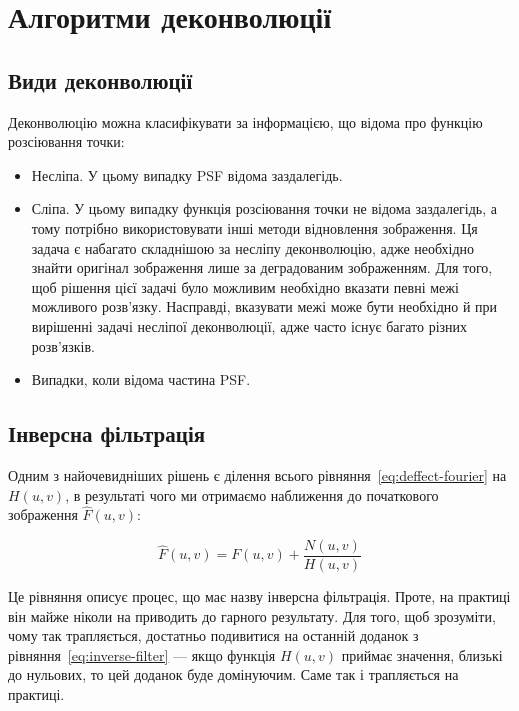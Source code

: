 \documentclass{diploma}
\begin{document}
  \section{Алгоритми деконволюції}
    \subsection{Види деконволюції}
      Деконволюцію можна класифікувати за інформацією, що відома про функцію
      розсіювання точки:
      \begin{itemize}
        \item Несліпа.
          У цьому випадку PSF відома заздалегідь.
        \item Сліпа.
          У цьому випадку функція розсіювання точки не відома заздалегідь, а
          тому потрібно використовувати інші методи відновлення зображення.
          Ця задача є набагато складнішою за несліпу деконволюцію, адже
          необхідно знайти оригінал зображення лише за деградованим зображенням.
          Для того, щоб рішення цієї задачі було можливим необхідно вказати
          певні межі можливого розв’язку.
          Насправді, вказувати межі може бути необхідно й при вирішенні задачі
          несліпої деконволюції, адже часто існує багато різних розв’язків.
        \item Випадки, коли відома частина PSF.
      \end{itemize}
      \clearpage
    \subsection{Інверсна фільтрація}
      Одним з найочевидніших рішень є ділення всього
      рівняння~\eqref{eq:deffect-fourier} на $H\left( u, v \right)$, в
      результаті чого ми отримаємо наближення до початкового зображення
      $\hat{F}\left( u, v \right)$:

      \begin{equation}
        \hat{F}\left( u, v \right) = F\left( u, v \right) + \frac{N\left( u, v
        \right)}{H\left( u, v \right)}
        \label{eq:inverse-filter}
      \end{equation}

      Це рівняння описує процес, що має назву інверсна фільтрація.
      Проте, на практиці він майже ніколи на приводить до гарного результату.
      Для того, щоб зрозуміти, чому так трапляється, достатньо подивитися на
      останній доданок з рівняння~\eqref{eq:inverse-filter} --- якщо функція $H\left(
      u, v \right)$ приймає значення, близькі до нульових, то цей доданок буде
      домінуючим.
      Саме так і трапляється на практиці.
\end{document}

